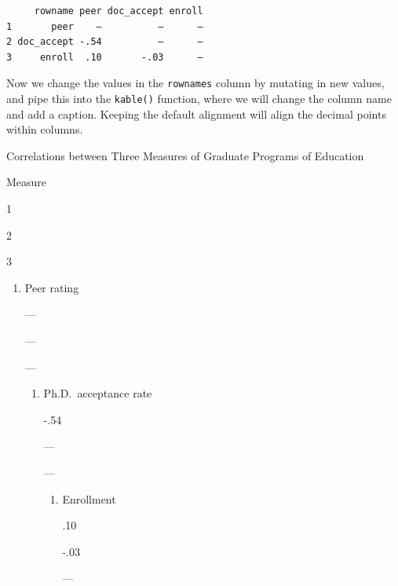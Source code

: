 \documentclass[]{book}
\newenvironment{Shaded}{\begin{snugshade}}{\end{snugshade}}
\newcommand{\DataTypeTok}[1]{\textcolor[rgb]{0.13,0.29,0.53}{#1}}
\newcommand{\DecValTok}[1]{\textcolor[rgb]{0.00,0.00,0.81}{#1}}
\newcommand{\KeywordTok}[1]{\textcolor[rgb]{0.13,0.29,0.53}{\textbf{#1}}}
\newcommand{\NormalTok}[1]{#1}
\newcommand{\OperatorTok}[1]{\textcolor[rgb]{0.81,0.36,0.00}{\textbf{#1}}}
\newcommand{\StringTok}[1]{\textcolor[rgb]{0.31,0.60,0.02}{#1}}
\providecommand{\tightlist}{%
  \setlength{\itemsep}{0pt}\setlength{\parskip}{0pt}}
\begin{document}
\begin{verbatim}
     rowname peer doc_accept enroll
1       peer    —          —      —
2 doc_accept -.54          —      —
3     enroll  .10       -.03      —
\end{verbatim}

Now we change the values in the \texttt{rownames} column by mutating in new values, and pipe this into the \texttt{kable()} function, where we will change the column name and add a caption. Keeping the default alignment will align the decimal points within columns.

\begin{Shaded}
\end{Shaded}

\label{tab:unnamed-chunk-15}Correlations between Three Measures of Graduate Programs of Education

Measure

1

2

3

\begin{enumerate}
\def\labelenumi{\arabic{enumi}.}
\tightlist
\item
  Peer rating

  ---

  ---

  ---

  \begin{enumerate}
  \def\labelenumii{\arabic{enumii}.}
  \setcounter{enumii}{1}
  \tightlist
  \item
    Ph.D.~acceptance rate

    -.54

    ---

    ---

    \begin{enumerate}
    \def\labelenumiii{\arabic{enumiii}.}
    \setcounter{enumiii}{2}
    \tightlist
    \item
      Enrollment

      .10

      -.03

      ---
    \end{enumerate}
  \end{enumerate}
\end{enumerate}
\end{document}
